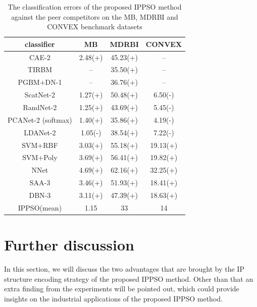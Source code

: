 \documentclass[conference]{IEEEtran}
\begin{document}
\begin{table}[!t]
	\renewcommand{\arraystretch}{1.3}
	\caption{The classification errors of the proposed IPPSO method against the peer competitors on the MB, MDRBI and CONVEX benchmark datasets}
	\label{table:ResultComparison}
	\centering
	\begin{tabular}{|c|c|c|c|}
		\hline
		classiﬁer & MB & MDRBI & CONVEX\\
		\hline
		CAE-2 & 2.48(+) & 45.23(+) & --\\
		\hline
		TIRBM & -- & 35.50(+) & --\\
		\hline
		PGBM+DN-1 & -- & 36.76(+) & --\\
		\hline
		ScatNet-2 & 1.27(+) & 50.48(+) & 6.50(-)\\
		\hline
		RandNet-2 & 1.25(+) & 43.69(+) & 5.45(-)\\
		\hline
		PCANet-2 (softmax)  & 1.40(+) & 35.86(+) & 4.19(-)\\
		\hline
		LDANet-2 & 1.05(-) & 38.54(+) & 7.22(-)\\
		\hline
		SVM+RBF & 3.03(+) & 55.18(+) & 19.13(+)\\
		\hline
		SVM+Poly & 3.69(+) & 56.41(+) & 19.82(+)\\
		\hline
		NNet & 4.69(+) & 62.16(+) & 32.25(+)\\
		\hline
		SAA-3 & 3.46(+) & 51.93(+) & 18.41(+)\\
		\hline
		DBN-3  & 3.11(+) & 47.39(+) & 18.63(+)\\
		\hline
		IPPSO(mean) & 1.15 & 33 & 14\\
		\hline
	\end{tabular}
\end{table}

\section{Further discussion}\label{sec:FurtherDicsussion}

In this section, we will discuss the two advantages that are brought by the IP structure encoding strategy of the proposed IPPSO method. Other than that an extra finding from the experiments will be pointed out, which could provide insights on the industrial applications of the proposed IPPSO method. 
\end{document}
